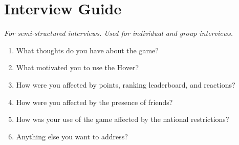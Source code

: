 \section{Interview Guide}
\label{appendix:interview_guide}

\textit{For semi-structured interviews. Used for individual and group interviews.}
\begin{enumerate}
    \item What thoughts do you have about the game?
    \item What motivated you to use the Hover?
    \item How were you affected by points, ranking leaderboard, and reactions? 
    \item How were you affected by the presence of friends?
    \item How was your use of the game affected by the national restrictions?
    \item Anything else you want to address?
\end{enumerate}
